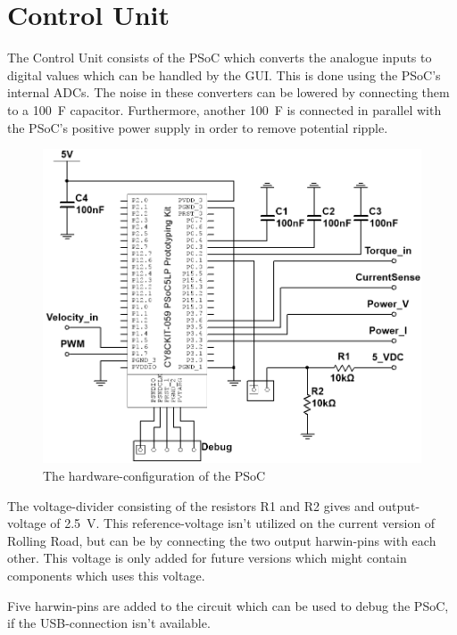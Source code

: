 \newpage
\section{Control Unit}
The Control Unit consists of the PSoC which converts the analogue inputs to digital values which can be handled by the GUI. This is done using the PSoC's internal ADCs. The noise in these converters can be lowered by connecting them to a \SI{100}{\farad} capacitor. Furthermore, another \SI{100}{\farad} is connected in parallel with the PSoC's positive power supply in order to remove potential ripple.

\begin{figure}[H]
	\centering
	\includegraphics[width=0.8\linewidth]{Hardware/Pictures/PSoC}
	\caption{The hardware-configuration of the PSoC}
	\label{fig:PSoC_Hardware}
\end{figure}

The voltage-divider consisting of the resistors R1 and R2 gives and output-voltage of \SI{2.5}{\volt}. This reference-voltage isn't utilized on the current version of Rolling Road, but can be by connecting the two output harwin-pins with each other. This voltage is only added for future versions which might contain components which uses this voltage.

Five harwin-pins are added to the circuit which can be used to debug the PSoC, if the USB-connection isn't available.